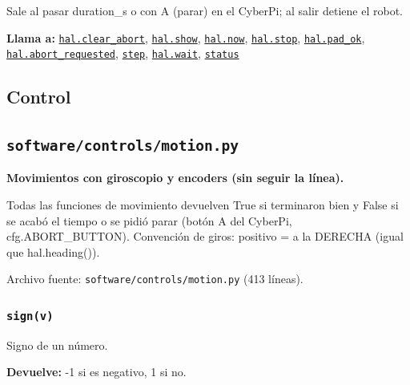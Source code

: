Sale al pasar duration\_s o con A (parar) en el CyberPi; al salir detiene el robot.

\par{}\par\smallskip
\noindent\textbf{Llama a:} \hyperref[fn:hal:clear-abort]{\texttt{hal.clear\_\allowbreak{}abort}}, \hyperref[fn:hal:show]{\texttt{hal.show}}, \hyperref[fn:hal:now]{\texttt{hal.now}}, \hyperref[fn:hal:stop]{\texttt{hal.stop}}, \hyperref[fn:hal:pad-ok]{\texttt{hal.pad\_\allowbreak{}ok}}, \hyperref[fn:hal:abort-requested]{\texttt{hal.abort\_\allowbreak{}requested}}, \hyperref[fn:manual:step]{\texttt{step}}, \hyperref[fn:hal:wait]{\texttt{hal.wait}}, \hyperref[fn:manual:status]{\texttt{status}}\par

\subsection*{Control}
\subsection{\texttt{software/controls/motion.py}}\label{mod:motion}
\textbf{Movimientos con giroscopio y encoders (sin seguir la línea).}

Todas las funciones de movimiento devuelven True si terminaron bien y False si se acabó el tiempo o se pidió parar (botón A del CyberPi, cfg.ABORT\_BUTTON). Convención de giros: positivo = a la DERECHA (igual que hal.heading()).

\noindent Archivo fuente: \texttt{software/controls/motion.py} (413 l\'ineas).

\subsubsection{\texttt{sign(v)}}\label{fn:motion:sign}
\noindent Signo de un número.

\par{}\par\smallskip
\noindent\textbf{Devuelve:} -1 si es negativo, 1 si no.\par

